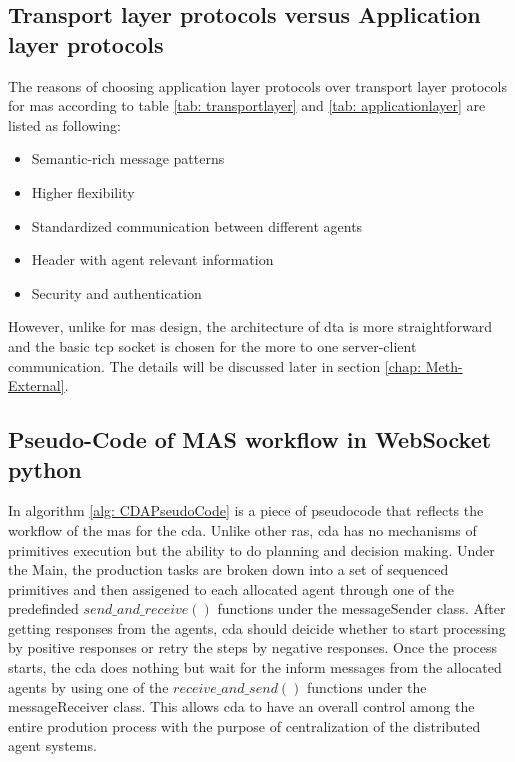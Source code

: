 \subsection{Transport layer protocols versus Application layer protocols}
The reasons of choosing application layer protocols over transport layer protocols for \gls{mas} according to table \ref{tab: transportlayer} and \ref{tab: applicationlayer} are listed as following:
\begin{itemize}
    \item Semantic-rich message patterns
    \item Higher flexibility
    \item Standardized communication between different agents
    \item Header with agent relevant information
    \item Security and authentication
    \end{itemize}
However, unlike for \gls{mas} design, the architecture of \gls{dta} is more straightforward and the basic \gls{tcp} socket is chosen for the more to one server-client communication. 
The details will be discussed later in section \ref{chap: Meth-External}.

\subsection{Pseudo-Code of MAS workflow in WebSocket python}
In algorithm \ref{alg: CDAPseudoCode} is a piece of pseudocode that reflects the workflow of the \gls{mas} for the \gls{cda}. 
Unlike other \gls{ras}, \gls{cda} has no mechanisms of primitives execution but the ability to do planning and decision making. 
Under the Main, the production tasks are broken down into a set of sequenced primitives and then assigened to each allocated agent through one of the predefinded $send\_and\_receive()$ functions under the messageSender class.
After getting responses from the agents, \gls{cda} should deicide whether to start processing by positive responses or retry the steps by negative responses.  
Once the process starts, the \gls{cda} does nothing but wait for the inform messages from the allocated agents by using one of the $receive\_and\_send()$ functions under the messageReceiver class. 
This allows \gls{cda} to have an overall control among the entire prodution process with the purpose of centralization of the distributed agent systems.  


